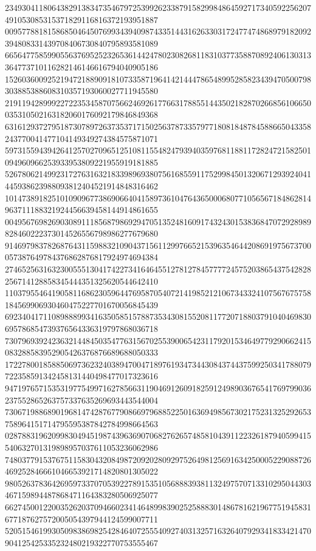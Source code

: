 \begin{DoxyCode}
      234930411806438291383473546797253992623387915829984864592717340592256207491053085315371829116816372193951887
      009577881815868504645076993439409874335144316263303172477474868979182092394808331439708406730840795893581089
      665647758599055637695252326536144247802308268118310377358870892406130313364773710116282146146616794040905186
      152603600925219472188909181073358719641421444786548995285823439470500798303885388608310357193060027711945580
      219119428999227223534587075662469261776631788551443502182870266856106650035310502163182060176092179846849368
      631612937279518730789726373537171502563787335797718081848784588665043358243770041477104149349274384575871071
      597315594394264125702709651251081155482479394035976811881172824721582501094960966253933953809221955919181885
      526780621499231727631632183398969380756168559117529984501320671293924041445938623988093812404521914848316462
      101473891825101090967738690664041589736104764365000680771056567184862814963711188321924456639458144914861655
      004956769826903089111856879869294705135248160917432430153836847072928989828460222373014526556798986277679680
      914697983782687643115988321090437156112997665215396354644208691975673700057387649784376862876817924974694384
      274652563163230055513041742273416464551278127845777724575203865437542828256714128858345444351325620544642410
      110379554641905811686230596447695870540721419852121067343324107567675758184569906930460475227701670056845439
      692340417110898889934163505851578873534308155208117720718803791040469830695786854739376564336319797868036718
      730796939242363214484503547763156702553900654231179201534649779290662415083288583952905426376876689688050333
      172278001858850697362324038947004718976193473443084374437599250341788079722358591342458131440498477017323616
      947197657153531977549971627856631190469126091825912498903676541769799036237552865263757337635269693443544004
      730671988689019681474287677908669796885225016369498567302175231325292653758964151714795595387842784998664563
      028788319620998304945198743963690706827626574858104391122326187940599415540632701319898957037611053236062986
      748037791537675115830432084987209202809297526498125691634250005229088726469252846661046653921714820801305022
      980526378364269597337070539227891535105688839381132497570713310295044303467159894487868471164383280506925077
      662745001220035262037094660234146489983902525888301486781621967751945831677187627572005054397944124599007711
      520515461993050983869825428464072555409274031325716326407929341833421470904125425335232480219322770753555467

\end{DoxyCode}
